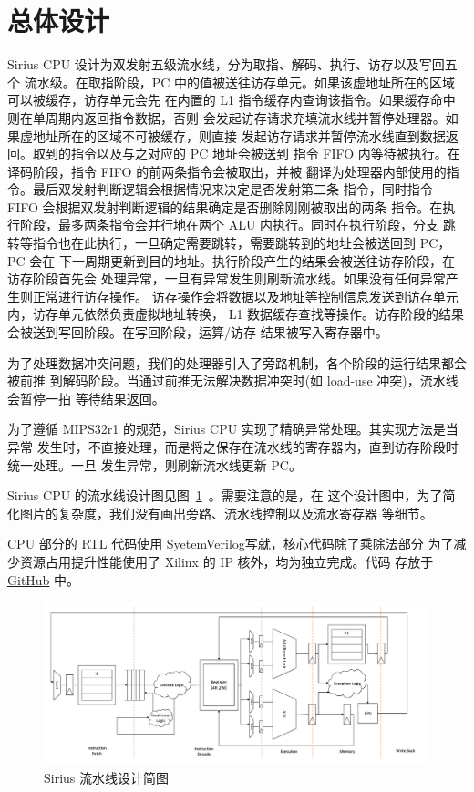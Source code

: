 \documentclass[blue,normal,cn,hide]{elegantbook}
\begin{document}
\section{总体设计}

Sirius CPU 设计为双发射五级流水线，分为取指、解码、执行、访存以及写回五个
流水级。在取指阶段，PC 中的值被送往访存单元。如果该虚地址所在的区域可以被缓存，访存单元会先
在内置的 L1 指令缓存内查询该指令。如果缓存命中则在单周期内返回指令数据，否则
会发起访存请求充填流水线并暂停处理器。如果虚地址所在的区域不可被缓存，则直接
发起访存请求并暂停流水线直到数据返回。取到的指令以及与之对应的 PC 地址会被送到
指令 FIFO 内等待被执行。在译码阶段，指令 FIFO 的前两条指令会被取出，并被
翻译为处理器内部使用的指令。最后双发射判断逻辑会根据情况来决定是否发射第二条
指令，同时指令 FIFO 会根据双发射判断逻辑的结果确定是否删除刚刚被取出的两条
指令。在执行阶段，最多两条指令会并行地在两个 ALU 内执行。同时在执行阶段，分支
跳转等指令也在此执行，一旦确定需要跳转，需要跳转到的地址会被送回到 PC，PC 会在
下一周期更新到目的地址。执行阶段产生的结果会被送往访存阶段，在访存阶段首先会
处理异常，一旦有异常发生则刷新流水线。如果没有任何异常产生则正常进行访存操作。
访存操作会将数据以及地址等控制信息发送到访存单元内，访存单元依然负责虚拟地址转换，
L1 数据缓存查找等操作。访存阶段的结果会被送到写回阶段。在写回阶段，运算/访存
结果被写入寄存器中。

为了处理数据冲突问题，我们的处理器引入了旁路机制，各个阶段的运行结果都会被前推
到解码阶段。当通过前推无法解决数据冲突时(如 load-use 冲突)，流水线会暂停一拍
等待结果返回。

为了遵循 MIPS32r1 的规范，Sirius CPU 实现了精确异常处理。其实现方法是当异常
发生时，不直接处理，而是将之保存在流水线的寄存器内，直到访存阶段时统一处理。一旦
发生异常，则刷新流水线更新 PC。

Sirius CPU 的流水线设计图见图~\ref{fig:SiriusPipeline}~。需要注意的是，在
这个设计图中，为了简化图片的复杂度，我们没有画出旁路、流水线控制以及流水寄存器
等细节。

CPU 部分的 RTL 代码使用 SyetemVerilog写就，核心代码除了乘除法部分
为了减少资源占用提升性能使用了 Xilinx 的 IP 核外，均为独立完成。代码
存放于 \href{https://github.com/name1e5s/Sirius}{GitHub} 中。

\begin{figure}[htpb]
    \centering
    \includegraphics[width=1.64\textwidth,angle=90]{figures/Sirius.pdf}
    \caption{Sirius 流水线设计简图}
    \label{fig:SiriusPipeline}
\end{figure}
\end{document}
